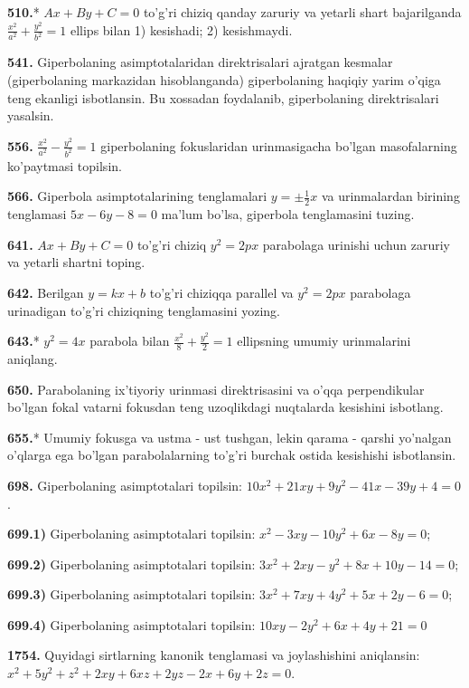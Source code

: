 \textbf{510.}* $Ax + By + C = 0$ to'g'ri chiziq qanday zaruriy va yetarli shart bajarilganda $\frac{x^{2}}{a^{2}} + \frac{y^{2}}{b^{2}} = 1$ ellips bilan 1) kesishadi; 2) kesishmaydi.

\textbf{541.} Giperbolaning asimptotalaridan direktrisalari ajratgan kesmalar (giperbolaning markazidan hisoblanganda) giperbolaning haqiqiy yarim o'qiga teng ekanligi isbotlansin. Bu xossadan foydalanib, giperbolaning direktrisalari yasalsin.

\textbf{556.} $\frac{x^{2}}{a^{2}} - \frac{y^{2}}{b^{2}} = 1$ giperbolaning fokuslaridan urinmasigacha bo'lgan masofalarning ko'paytmasi topilsin.

\textbf{566.} Giperbola asimptotalarining tenglamalari $y = \pm \frac{1}{2}x$ va urinmalardan birining tenglamasi $5x - 6y - 8 = 0$ ma'lum bo'lsa, giperbola tenglamasini tuzing.

\textbf{641.} $Ax + By + C = 0$ to'g'ri chiziq $y^{2} = 2px$ parabolaga urinishi uchun zaruriy va yetarli shartni toping.

\textbf{642.} Berilgan $y = kx + b$ to'g'ri chiziqqa parallel va $y^{2} = 2px$ parabolaga urinadigan to'g'ri chiziqning tenglamasini yozing.

\textbf{643.}* $y^{2} = 4x$ parabola bilan $\frac{x^{2}}{8} + \frac{y^{2}}{2} = 1$ ellipsning umumiy urinmalarini aniqlang.

\textbf{650.} Parabolaning ix'tiyoriy urinmasi direktrisasini va o'qqa perpendikular bo'lgan fokal vatarni fokusdan teng uzoqlikdagi nuqtalarda kesishini isbotlang.

\textbf{655.}* Umumiy fokusga va ustma - ust tushgan, lekin qarama - qarshi yo'nalgan o'qlarga ega bo'lgan parabolalarning to'g'ri burchak ostida kesishishi isbotlansin.

\textbf{698.} Giperbolaning asimptotalari topilsin: $10x^{2} + 21xy + 9y^{2} - 41x - 39y + 4 = 0$.

\textbf{699.1)} Giperbolaning asimptotalari topilsin: $x^{2} - 3xy - 10y^{2} + 6x - 8y = 0$;

\textbf{699.2)} Giperbolaning asimptotalari topilsin: $3x^{2} + 2xy - y^{2} + 8x + 10y - 14 = 0$;

\textbf{699.3)} Giperbolaning asimptotalari topilsin: $3x^{2} + 7xy + 4y^{2} + 5x + 2y - 6 = 0$;

\textbf{699.4)} Giperbolaning asimptotalari topilsin: $10xy - 2y^{2} + 6x + 4y + 21 = 0$

\textbf{1754.} Quyidagi sirtlarning kanonik tenglamasi va joylashishini aniqlansin: $x^{2} + 5y^{2} + z^{2} + 2xy + 6xz + 2yz - 2x + 6y + 2z = 0$.

